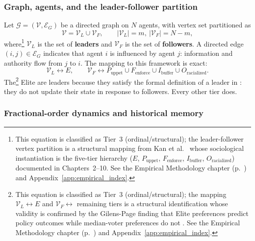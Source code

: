 \subsubsection*{Graph, agents, and the leader-follower partition}

Let $\mathcal{G} = (\mathcal{V}, \mathcal{E}_G)$ be a directed graph on $N$ agents, with vertex set partitioned as
\begin{equation}\label{eq:8.1-vertex-partition-graph}
\mathcal{V} = \mathcal{V}_L \cup \mathcal{V}_F, \qquad |\mathcal{V}_L| = m, \ |\mathcal{V}_F| = N-m,
\end{equation}
where\footnote{This equation is classified as Tier~3 (ordinal/structural); the leader-follower vertex partition is a structural mapping from Kan et al.\ \cite{kan_containment} whose sociological instantiation is the five-tier hierarchy ($E$, $P_{\text{uppet}}$, $F_{\text{enforce}}$, $I_{\text{buffer}}$, $O_{\text{racialized}}$) documented in Chapters~2--10. See the Empirical Methodology chapter (p.~\pageref{ch:empirical_methodology}) and Appendix~\ref{app:empirical_index}.} $\mathcal{V}_L$ is the set of \textbf{leaders} and $\mathcal{V}_F$ is the set of \textbf{followers}. A directed edge $(i,j) \in \mathcal{E}_G$ indicates that agent $i$ is influenced by agent $j$: information and authority flow from $j$ to $i$. The mapping to this framework is exact:
\begin{equation}\label{eq:8.2-tier-to-graph-mapping}
\mathcal{V}_L \longleftrightarrow E, \qquad \mathcal{V}_F \longleftrightarrow P_{\text{uppet}} \cup F_{\text{enforce}} \cup I_{\text{buffer}} \cup O_{\text{racialized}}.
\end{equation}
The\footnote{This equation is classified as Tier~3 (ordinal/structural); the mapping $\mathcal{V}_L \leftrightarrow E$ and $\mathcal{V}_F \leftrightarrow$ remaining tiers is a structural identification whose validity is confirmed by the Gilens-Page finding that Elite preferences predict policy outcomes while median-voter preferences do not \cite{gilens}. See the Empirical Methodology chapter (p.~\pageref{ch:empirical_methodology}) and Appendix~\ref{app:empirical_index}.} Elite are leaders because they satisfy the formal definition of a leader in \cite{kan_containment}: they do not update their state in response to followers. Every other tier does.

\subsubsection*{Fractional-order dynamics and historical memory}

